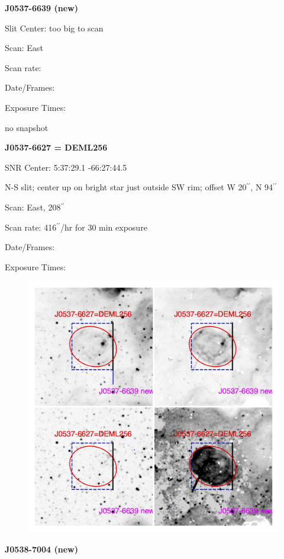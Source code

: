 \documentclass[11pt]{article}
\begin{document}
\newpage
{\bf J0537-6639 (new)}  
 
Slit Center:   too big to scan

Scan:  East

Scan rate:  

Date/Frames:

Exposure Times:  

no snapshot
\begin{figure}
\end{figure}

\newpage
{\bf J0537-6627 = DEML256}  
 
SNR Center:  5:37:29.1   -66:27:44.5    

N-S slit; center up on bright star just outside SW rim;  offset W 20$^{\prime\prime}$, N 94$^{\prime\prime}$

Scan:  East, 208$^{\prime\prime}$

Scan rate:  416$^{\prime\prime}$/hr for 30 min exposure

Date/Frames:

Exposure Times:  

\begin{figure}
\includegraphics[width=12.5cm]{snapshots/J0537-6627a.png}
\end{figure}

\newpage
{\bf J0538-7004 (new)}  
 
\end{document}
